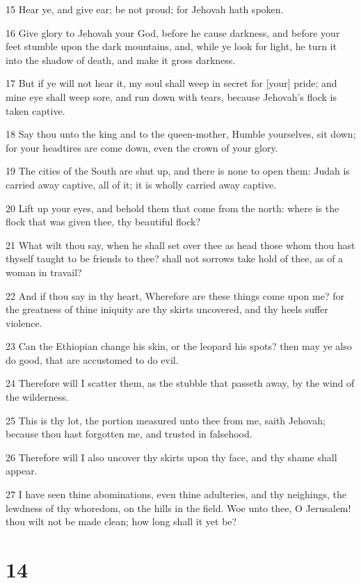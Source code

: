 \par 15 Hear ye, and give ear; be not proud; for Jehovah hath spoken.
\par 16 Give glory to Jehovah your God, before he cause darkness, and before your feet stumble upon the dark mountains, and, while ye look for light, he turn it into the shadow of death, and make it gross darkness.
\par 17 But if ye will not hear it, my soul shall weep in secret for [your] pride; and mine eye shall weep sore, and run down with tears, because Jehovah's flock is taken captive.
\par 18 Say thou unto the king and to the queen-mother, Humble yourselves, sit down; for your headtires are come down, even the crown of your glory.
\par 19 The cities of the South are shut up, and there is none to open them: Judah is carried away captive, all of it; it is wholly carried away captive.
\par 20 Lift up your eyes, and behold them that come from the north: where is the flock that was given thee, thy beautiful flock?
\par 21 What wilt thou say, when he shall set over thee as head those whom thou hast thyself taught to be friends to thee? shall not sorrows take hold of thee, as of a woman in travail?
\par 22 And if thou say in thy heart, Wherefore are these things come upon me? for the greatness of thine iniquity are thy skirts uncovered, and thy heels suffer violence.
\par 23 Can the Ethiopian change his skin, or the leopard his spots? then may ye also do good, that are accustomed to do evil.
\par 24 Therefore will I scatter them, as the stubble that passeth away, by the wind of the wilderness.
\par 25 This is thy lot, the portion measured unto thee from me, saith Jehovah; because thou hast forgotten me, and trusted in falsehood.
\par 26 Therefore will I also uncover thy skirts upon thy face, and thy shame shall appear.
\par 27 I have seen thine abominations, even thine adulteries, and thy neighings, the lewdness of thy whoredom, on the hills in the field. Woe unto thee, O Jerusalem! thou wilt not be made clean; how long shall it yet be?

\chapter{14}

